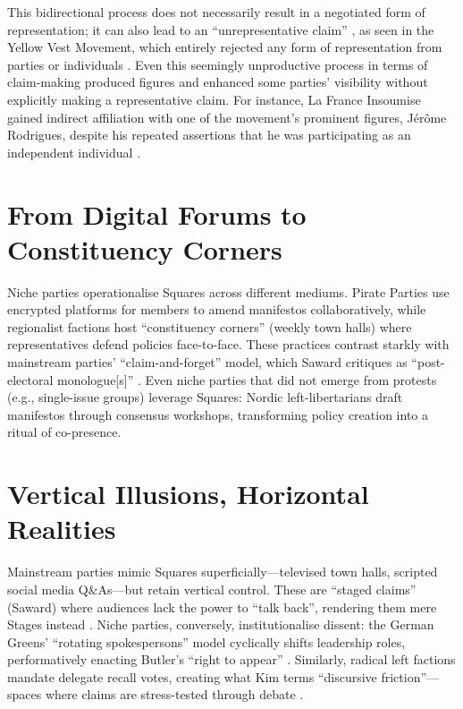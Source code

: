 This bidirectional process does not necessarily result in a negotiated form of representation; it can also lead to an \enquote{unrepresentative claim} \parencite{hayat2022, hayat2024}, as seen in the Yellow Vest Movement, which entirely rejected any form of representation from parties or individuals \parencite[1038-1039]{hayat2022}. Even this seemingly unproductive process in terms of claim-making produced figures and enhanced some parties’ visibility without explicitly making a representative claim. For instance, La France Insoumise gained indirect affiliation with one of the movement’s prominent figures, Jérôme Rodrigues, despite his repeated assertions that he was participating as an independent individual \parencite[1043]{hayat2022}.

\section{From Digital Forums to Constituency Corners}
Niche parties operationalise Squares across different mediums. Pirate Parties use encrypted platforms for members to amend manifestos collaboratively, while regionalist factions host \enquote{constituency corners} (weekly town halls) where representatives defend policies face-to-face. These practices contrast starkly with mainstream parties’ \enquote{claim-and-forget} model, which Saward critiques as \enquote{post-electoral monologue[s]} \parencite[8]{saward2024}. Even niche parties that did not emerge from protests (e.g., single-issue groups) leverage Squares: Nordic left-libertarians draft manifestos through consensus workshops, transforming policy creation into a ritual of co-presence.

\section{Vertical Illusions, Horizontal Realities}
Mainstream parties mimic Squares superficially—televised town halls, scripted social media Q\&As—but retain vertical control. These are \enquote{staged claims} (Saward) where audiences lack the power to \enquote{talk back}, rendering them mere Stages instead \parencite[8-9]{saward2024}. Niche parties, conversely, institutionalise dissent: the German Greens’ \enquote{rotating spokespersons} model cyclically shifts leadership roles, performatively enacting Butler’s \enquote{right to appear} \parencite[7]{kim2024}. Similarly, radical left factions mandate delegate recall votes, creating what Kim terms \enquote{discursive friction}—spaces where claims are stress-tested through debate \parencite[12]{kim2024}.

